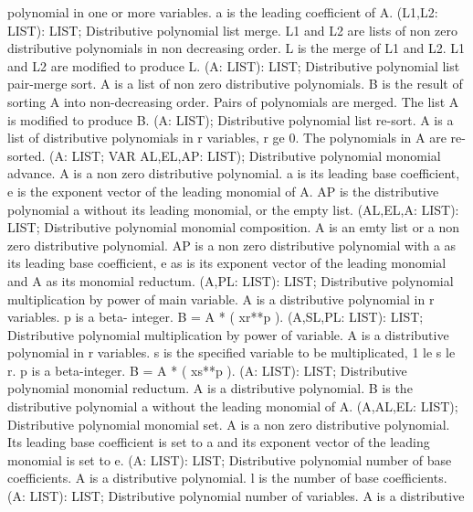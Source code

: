 polynomial in one or more variables. a is the leading
coefficient of A. \ecom 
{} (L1,L2: LIST): LIST; \eproc
\bcom Distributive polynomial list merge. L1 and L2 are lists
of non zero distributive polynomials in non decreasing
order.  L is the merge of L1 and L2. L1 and L2 are
modified to produce L.  \ecom 
{} (A: LIST): LIST; \eproc
\bcom Distributive polynomial list pair-merge sort. A is
a list of non zero distributive polynomials. B is the
result of sorting A into non-decreasing order. Pairs of
polynomials are merged. The list A is modified to produce B.  \ecom 
{} (A: LIST); \eproc
\bcom Distributive polynomial list re-sort. A is a list of
distributive  polynomials in r variables, r ge 0.
The polynomials in A are re-sorted.  \ecom 
{} (A: LIST; VAR AL,EL,AP: LIST); \eproc
\bcom Distributive polynomial monomial advance. A is a non zero
distributive polynomial. a is its leading base coefficient,
e is the exponent vector of the leading monomial of A.
AP is the distributive polynomial a without its leading
monomial, or the empty list.  \ecom 
{} (AL,EL,A: LIST): LIST; \eproc
\bcom Distributive polynomial monomial composition. A is an emty
list or a non zero distributive polynomial. AP is a non zero
distributive polynomial with a as its leading base coefficient,
e as is its exponent vector of the leading monomial and A as
its monomial reductum.  \ecom 
{} (A,PL: LIST): LIST; \eproc
\bcom Distributive polynomial multiplication by power of main variable.
A is a distributive polynomial in r variables. p is a beta-
integer. B = A * ( xr**p ).  \ecom 
{} (A,SL,PL: LIST): LIST; \eproc
\bcom Distributive polynomial multiplication by power of variable.
A is a distributive polynomial in r variables. s is the specified
variable to be multiplicated, 1 le s le r. p is a beta-integer.
B = A * ( xs**p ).  \ecom 
{} (A: LIST): LIST; \eproc
\bcom Distributive polynomial monomial reductum. A is a distributive
polynomial. B is the distributive polynomial a without the
leading monomial of A.  \ecom 
{} (A,AL,EL: LIST); \eproc
\bcom Distributive polynomial monomial set. A is a non zero
distributive polynomial. Its leading base coefficient is set
to a and its exponent vector of the leading monomial is
set to e.  \ecom 
{} (A: LIST): LIST; \eproc
\bcom Distributive polynomial number of base coefficients. A is a
distributive polynomial. l is the number of base coefficients. \ecom 
{} (A: LIST): LIST; \eproc
\bcom Distributive polynomial number of variables. A is a distributive
